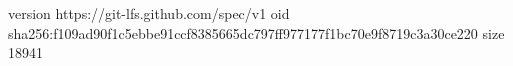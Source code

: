 version https://git-lfs.github.com/spec/v1
oid sha256:f109ad90f1c5ebbe91ccf8385665dc797ff977177f1bc70e9f8719c3a30ce220
size 18941
